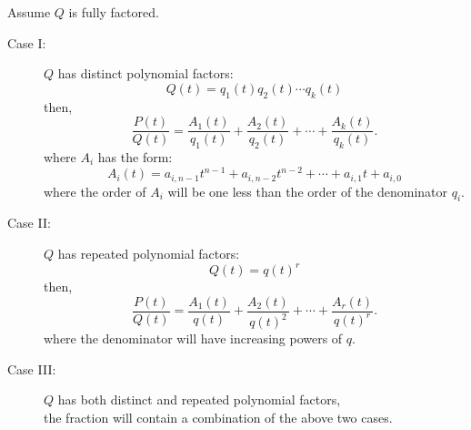 \documentclass{article}
\begin{document}
Assume \(Q\) is fully factored.
\begin{description}
    \item[Case I:] \(Q\) has distinct polynomial factors:
        \begin{equation*}
            Q\left( t \right) = q_1\left( t \right) q_2\left( t \right) \cdots q_k\left( t \right)
        \end{equation*}
        then,
        \begin{equation*}
            \frac{P\left( t \right)}{Q\left( t \right)} = \frac{A_1\left( t \right)}{q_1\left( t \right)} + \frac{A_2\left( t \right)}{q_2\left( t \right)} + \cdots + \frac{A_k\left( t \right)}{q_k\left( t \right)}.
        \end{equation*}
        where \(A_i\) has the form:
        \begin{equation*}
            A_i\left( t \right) = a_{i,n-1} t^{n - 1} + a_{i,n-2} t^{n - 2} + \cdots + a_{i,1} t + a_{i,0}
        \end{equation*}
        where the order of \(A_i\) will be one less than the order of the denominator \(q_i\).
    \item[Case II:] \(Q\) has repeated polynomial factors:
        \begin{equation*}
            Q\left( t \right) = q\left( t \right)^r
        \end{equation*}
        then,
        \begin{equation*}
            \frac{P\left( t \right)}{Q\left( t \right)} = \frac{A_1\left( t \right)}{q\left( t \right)} + \frac{A_2\left( t \right)}{q\left( t \right)^2} + \cdots + \frac{A_r\left( t \right)}{q\left( t \right)^r}.
        \end{equation*}
        where the denominator will have increasing powers of \(q\).
    \item[Case III:] \(Q\) has both distinct and repeated polynomial factors,\\
        the fraction will contain a combination of the above two cases.
\end{description}
\end{document}
